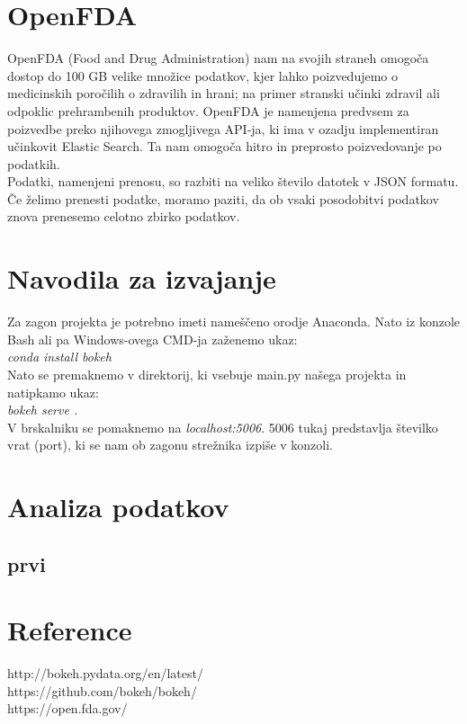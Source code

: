 \documentclass[a4paper,10pt]{article}
\begin{document}
\section{OpenFDA}
OpenFDA (Food and Drug Administration) nam na svojih straneh omogoča dostop do 100 GB velike množice podatkov, kjer lahko poizvedujemo o medicinskih poročilih o zdravilih in hrani; na primer stranski učinki zdravil ali odpoklic prehrambenih produktov. OpenFDA je namenjena predvsem za poizvedbe preko njihovega zmogljivega API-ja, ki ima v ozadju implementiran učinkovit Elastic Search. Ta nam omogoča hitro in preprosto poizvedovanje po podatkih. \\
Podatki, namenjeni prenosu, so razbiti na veliko število datotek v JSON formatu. Če želimo prenesti podatke, moramo paziti, da ob vsaki posodobitvi podatkov znova prenesemo celotno zbirko podatkov.
\section{Navodila za izvajanje}
Za zagon projekta je potrebno imeti nameščeno orodje Anaconda. Nato iz konzole Bash ali pa Windows-ovega CMD-ja zaženemo ukaz: \\ \textit{conda install bokeh} \\
Nato se premaknemo v direktorij, ki vsebuje main.py našega projekta in natipkamo ukaz: \\ \textit{bokeh serve .} \\ V brskalniku se pomaknemo na \textit{localhost:5006}. 5006 tukaj predstavlja številko vrat (port), ki se nam ob zagonu strežnika izpiše v konzoli. 
\section{Analiza podatkov}
\subsection{prvi}


\section{Reference}
http://bokeh.pydata.org/en/latest/ \\
https://github.com/bokeh/bokeh/ \\
https://open.fda.gov/
\end{document}
